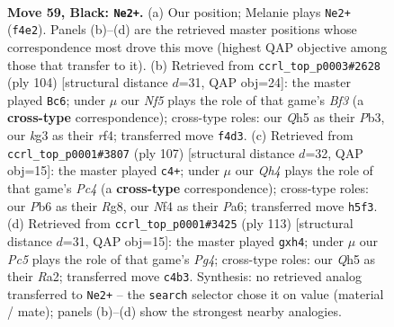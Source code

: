 \documentclass[11pt]{article}
\begin{document}
\clearpage

\begin{figure}[p]\centering
\begin{subfigure}{0.46\textwidth}\centering
\resizebox{\linewidth}{!}{%
\newchessgame
\chessboard[
  setfen={8/p5k1/1p6/7q/P1p2n2/RP4K1/8/8 b - - 1 59},
  showmover=false,
  pgfstyle=straightmove, color=movearrow, markmove={f4-e2}
]}
\caption{}
\end{subfigure}\hfill
\begin{subfigure}{0.46\textwidth}\centering
\resizebox{\linewidth}{!}{%
\newchessgame
\chessboard[
  setfen={8/6k1/5p2/4N3/P4r1p/1P3B2/2K4P/8 w - - 0 53},
  showmover=false,
  pgfstyle=straightmove, color=movearrow, markmove={f3-c6}
]}
\caption{}
\end{subfigure}
\\[4pt]
\begin{subfigure}{0.46\textwidth}\centering
\resizebox{\linewidth}{!}{%
\newchessgame
\chessboard[
  setfen={6r1/8/p3k3/1pp4P/P4RP1/3K4/8/8 b - - 4 54},
  showmover=false,
  pgfstyle=straightmove, color=movearrow, markmove={c5-c4}
]}
\caption{}
\end{subfigure}\hfill
\begin{subfigure}{0.46\textwidth}\centering
\resizebox{\linewidth}{!}{%
\newchessgame
\chessboard[
  setfen={8/4k3/7R/6p1/5pPP/8/r7/5K2 b - - 0 57},
  showmover=false,
  pgfstyle=straightmove, color=movearrow, markmove={g5-h4}
]}
\caption{}
\end{subfigure}
\caption{\textbf{Move 59, Black: \texttt{Ne2+}.} (a) Our position; Melanie plays \texttt{Ne2+} (\texttt{f4e2}). Panels (b)--(d) are the retrieved master positions whose correspondence most drove this move (highest QAP objective among those that transfer to it). (b) Retrieved from \texttt{ccrl\_top\_p0003\#2628} (ply 104) [structural distance $d$=31, QAP obj=24]: the master played \texttt{Bc6}; under $\mu$ our \emph{Nf5} plays the role of that game's \emph{Bf3} (a \textbf{cross-type} correspondence); cross-type roles: our \emph{Q}h5 as their \emph{P}b3, our \emph{k}g3 as their \emph{r}f4; transferred move \texttt{f4d3}. (c) Retrieved from \texttt{ccrl\_top\_p0001\#3807} (ply 107) [structural distance $d$=32, QAP obj=15]: the master played \texttt{c4+}; under $\mu$ our \emph{Qh4} plays the role of that game's \emph{Pc4} (a \textbf{cross-type} correspondence); cross-type roles: our \emph{P}b6 as their \emph{R}g8, our \emph{N}f4 as their \emph{P}a6; transferred move \texttt{h5f3}. (d) Retrieved from \texttt{ccrl\_top\_p0001\#3425} (ply 113) [structural distance $d$=31, QAP obj=15]: the master played \texttt{gxh4}; under $\mu$ our \emph{Pc5} plays the role of that game's \emph{Pg4}; cross-type roles: our \emph{Q}h5 as their \emph{R}a2; transferred move \texttt{c4b3}. Synthesis: no retrieved analog transferred to \texttt{Ne2+} -- the \texttt{search} selector chose it on value (material / mate); panels (b)--(d) show the strongest nearby analogies.}
\label{fig:thought-m117}
\end{figure}
\end{document}
